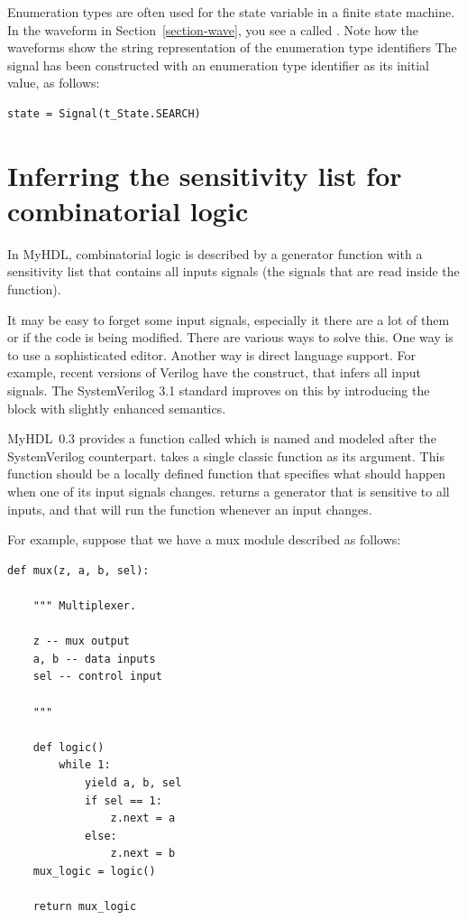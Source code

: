 \documentclass{howto}
\newcommand{\myhdl}{\protect \mbox{MyHDL}}
\begin{document}
Enumeration types are often used for the state variable in a finite
state machine.  In the waveform in Section~\ref{section-wave}, you see
a  called . Note how the waveforms show the
string representation of the enumeration type identifiers The
 signal has been constructed with an enumeration type
identifier as its initial value, as follows:

\begin{verbatim}
state = Signal(t_State.SEARCH)
\end{verbatim}

\section{Inferring the sensitivity list for combinatorial
logic\label{section-combinatorial}}

In \myhdl{}, combinatorial logic is described by a generator function with
a sensitivity list that contains all inputs signals (the signals that
are read inside the function).

It may be easy to forget some input signals, especially it there are a
lot of them or if the code is being modified. There are various ways
to solve this. One way is to use a sophisticated editor. Another way
is direct language support. For example, recent versions of Verilog
have the  construct, that infers all input
signals. The SystemVerilog 3.1 standard improves on this by
introducing the  block with slightly enhanced
semantics.

\myhdl\ 0.3 provides a function called  which
is named and modeled after the SystemVerilog counterpart.
 takes a single classic function as its
argument. This function should be a locally defined function that
specifies what should happen when one of its input signals
changes.  returns a generator that is
sensitive to all inputs, and that will run the function whenever an
input changes.

For example, suppose that we have a mux module described as follows:

\begin{verbatim}
def mux(z, a, b, sel):

    """ Multiplexer.
    
    z -- mux output
    a, b -- data inputs
    sel -- control input

    """

    def logic()
        while 1:
            yield a, b, sel
            if sel == 1:
                z.next = a
            else:
                z.next = b
    mux_logic = logic()

    return mux_logic
\end{verbatim}
\end{document}
